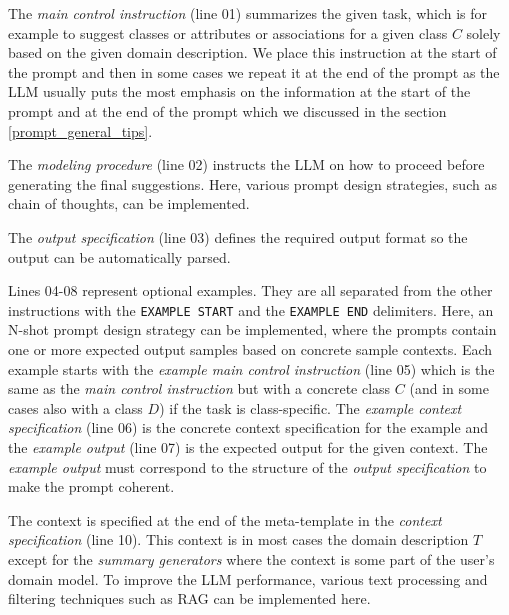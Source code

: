 The \emph{main control instruction} (line 01) summarizes the given task, which is for example to suggest classes or attributes or associations for a given class $C$ solely based on the given domain description. We place this instruction at the start of the prompt and then in some cases we repeat it at the end of the prompt as the LLM usually puts the most emphasis on the information at the start of the prompt and at the end of the prompt which we discussed in the section \ref{prompt_general_tips}.

The \textit{modeling procedure} (line 02) instructs the LLM on how to proceed before generating the final suggestions. Here, various prompt design strategies, such as chain of thoughts, can be implemented.

The \textit{output specification} (line 03) defines the required output format so the output can be automatically parsed.

Lines 04-08 represent optional examples. They are all separated from the other instructions with the \texttt{EXAMPLE START} and the \texttt{EXAMPLE END} delimiters. Here, an N-shot prompt design strategy can be implemented, where the prompts contain one or more expected output samples based on concrete sample contexts. Each example starts with the \emph{example main control instruction} (line 05) which is the same as the \emph{main control instruction} but with a concrete class $C$ (and in some cases also with a class $D$) if the task is class-specific. The \emph{example context specification} (line 06) is the concrete context specification for the example and the \emph{example output} (line 07) is the expected output for the given context. The \emph{example output} must correspond to the structure of the \emph{output specification} to make the prompt coherent.

The context is specified at the end of the meta-template in the \emph{context specification} (line 10). This context is in most cases the domain description $T$ except for the \emph{summary generators} where the context is some part of the user's domain model. To improve the LLM performance, various text processing and filtering techniques such as RAG can be implemented here.